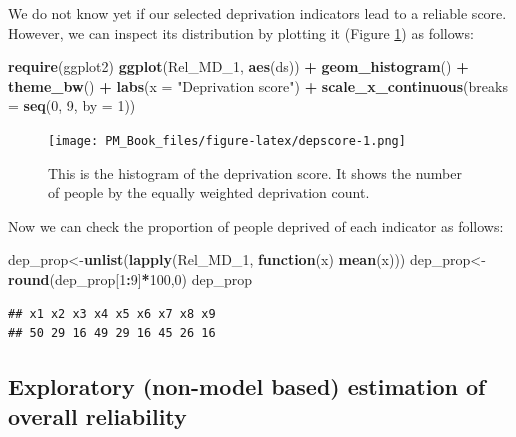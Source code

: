 \documentclass[]{book}
\newenvironment{Shaded}{\begin{snugshade}}{\end{snugshade}}
\newcommand{\ControlFlowTok}[1]{\textcolor[rgb]{0.13,0.29,0.53}{\textbf{#1}}}
\newcommand{\DataTypeTok}[1]{\textcolor[rgb]{0.13,0.29,0.53}{#1}}
\newcommand{\DecValTok}[1]{\textcolor[rgb]{0.00,0.00,0.81}{#1}}
\newcommand{\KeywordTok}[1]{\textcolor[rgb]{0.13,0.29,0.53}{\textbf{#1}}}
\newcommand{\NormalTok}[1]{#1}
\newcommand{\OperatorTok}[1]{\textcolor[rgb]{0.81,0.36,0.00}{\textbf{#1}}}
\newcommand{\StringTok}[1]{\textcolor[rgb]{0.31,0.60,0.02}{#1}}
\begin{document}
We do not know yet if our selected deprivation indicators lead to a reliable score. However, we can inspect its distribution by plotting it (Figure \ref{fig:depscore}) as follows:

\begin{Shaded}
\begin{Highlighting}[]
\KeywordTok{require}\NormalTok{(ggplot2)}
\KeywordTok{ggplot}\NormalTok{(Rel_MD_}\DecValTok{1}\NormalTok{, }\KeywordTok{aes}\NormalTok{(ds)) }\OperatorTok{+}
\StringTok{    }\KeywordTok{geom_histogram}\NormalTok{() }\OperatorTok{+}\StringTok{ }\KeywordTok{theme_bw}\NormalTok{() }\OperatorTok{+}\StringTok{ }\KeywordTok{labs}\NormalTok{(}\DataTypeTok{x =} \StringTok{"Deprivation score"}\NormalTok{) }\OperatorTok{+}\StringTok{ }
\StringTok{  }\KeywordTok{scale_x_continuous}\NormalTok{(}\DataTypeTok{breaks =} \KeywordTok{seq}\NormalTok{(}\DecValTok{0}\NormalTok{, }\DecValTok{9}\NormalTok{, }\DataTypeTok{by =} \DecValTok{1}\NormalTok{))}
\end{Highlighting}
\end{Shaded}

\begin{figure}
\centering
\texttt{[image: PM\_Book\_files/figure-latex/depscore-1.png]}
\caption{\label{fig:depscore}This is the histogram of the deprivation score. It shows the number of people by the equally weighted deprivation count.}
\end{figure}

Now we can check the proportion of people deprived of each indicator as follows:

\begin{Shaded}
\begin{Highlighting}[]
\NormalTok{dep_prop<-}\KeywordTok{unlist}\NormalTok{(}\KeywordTok{lapply}\NormalTok{(Rel_MD_}\DecValTok{1}\NormalTok{, }\ControlFlowTok{function}\NormalTok{(x) }\KeywordTok{mean}\NormalTok{(x)))}
\NormalTok{dep_prop<-}\KeywordTok{round}\NormalTok{(dep_prop[}\DecValTok{1}\OperatorTok{:}\DecValTok{9}\NormalTok{]}\OperatorTok{*}\DecValTok{100}\NormalTok{,}\DecValTok{0}\NormalTok{)}
\NormalTok{dep_prop}
\end{Highlighting}
\end{Shaded}

\begin{verbatim}
## x1 x2 x3 x4 x5 x6 x7 x8 x9 
## 50 29 16 49 29 16 45 26 16
\end{verbatim}

\hypertarget{Chapter-3-expoverel}{%
\subsection{Exploratory (non-model based) estimation of overall reliability}\label{Chapter-3-expoverel}}
\end{document}

